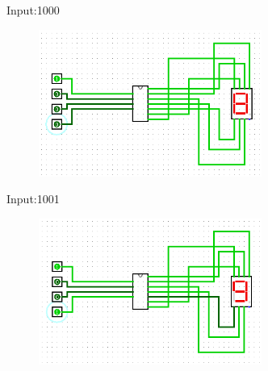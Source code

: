 \documentclass[]{article}
\begin{document}
Input:1000
\begin{figure}[H]
	\centering
	\includegraphics[width=0.65\textwidth]{8.png}
\end{figure}
Input:1001
\begin{figure}[H]
	\centering
	\includegraphics[width=0.65\textwidth]{9.png}
\end{figure}
\end{document}
